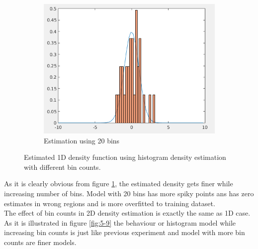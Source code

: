 \documentclass[12pt]{article}
\begin{document}
\begin{itemize}
\begin{figure}
\begin{subfigure}{0.45\textwidth}
\includegraphics[scale=0.35]{Imgs/5-25.png}
\caption{Estimation using 20 bins}
\end{subfigure}
\caption{Estimated 1D density function using histogram density estimation with different bin counts.}
\label{fig:5-8}
\end{figure}

As it is clearly obvious from figure \ref{fig:5-8}, the estimated density gets finer while increasing number of bins. Model with 20 bins has more spiky points ans has zero estimates in wrong regions and is more overfitted to training dataset.\\
The effect of bin counts in 2D density estimation is exactly the same as 1D case. As it is illustrated in figure \ref{fig:5-9} the behaviour or histogram model while increasing bin counts is just like previous experiment and model with more bin counts are finer models.



\end{itemize}
\end{document}
